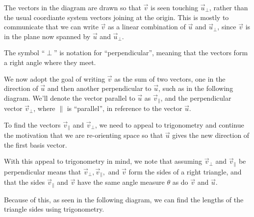 \documentclass{ximera}
\begin{document}
    The vectors in the diagram are drawn so that $\vec{v}$ is seen touching $\vec{u}_\perp$, rather than the usual coordiante system vectors joining at the origin. This is mostly to communicate that we can write $\vec{v}$ as a linear combination of $\vec{u}$ and $\vec{u}_\perp$, since $\vec{v}$ is in the plane now spanned by $\vec{u}$ and $\vec{u}_\perp$.

    The symbol ``$\perp$'' is notation for ``perpendicular'', meaning that the vectors form a right angle where they meet. 

    We now adopt the goal of writing $\vec{v}$ as the sum of two vectors, one in the direction of $\vec{u}$ and then another perpendicular to $\vec{u}$, such as in the following diagram. We'll denote the vector parallel to $\vec{u}$ as $\vec{v}_\parallel$, and the perpendicular vector $\vec{v}_\perp$, where $\parallel$ is ``parallel'', in reference to the vector $\vec{u}$.

    \begin{center}
      
     \end{center}

     To find the vectors $\vec{v}_\parallel$ and $\vec{v}_\perp$, we need to appeal to trigonometry and continue the motivation that we are re-orienting space so that $\vec{u}$ gives the new direction of the first basis vector. 

     With this appeal to trigonometry in mind, we note that assuming $\vec{v}_\perp$ and $\vec{v}_\parallel$ be perpendicular means that $\vec{v}_\perp, \vec{v}_\parallel,$ and $\vec{v}$ form the sides of a right triangle, and that the sides $\vec{v}_\parallel$ and $\vec{v}$ have the same angle measure $\theta$ as do $\vec{v}$ and $\vec{u}$.

     Because of this, as seen in the following diagram, we can find the lengths of the triangle sides using trigonometry.
\end{document}
